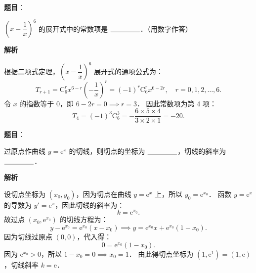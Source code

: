 \begin{answer}

\textbf{题目}：

$\left(x - \dfrac{1}{x}\right)^6$ 的展开式中的常数项是 $\underline{\hspace{1.5cm}}$．（用数字作答）

\textbf{解析}

根据二项式定理，$\left(x - \dfrac{1}{x}\right)^6$ 展开式的通项公式为：
\nopagebreak[4]
\[
T_{r+1} = \mathrm{C}_6^r x^{6-r} \left(-\frac{1}{x}\right)^r = (-1)^r \mathrm{C}_6^r x^{6-2r}, \quad r = 0, 1, 2, \dots, 6.
\]
令 $x$ 的指数等于 0，即 $6 - 2r = 0 \implies r = 3$．
因此常数项为第 4 项：
\nopagebreak[4]
\[
T_4 = (-1)^3 \mathrm{C}_6^3 = - \frac{6 \times 5 \times 4}{3 \times 2 \times 1} = -20.
\]


\end{answer}
\begin{answer}

\textbf{题目}：

过原点作曲线 $y = \mathrm{e}^x$ 的切线，则切点的坐标为 $\underline{\hspace{1.5cm}}$，切线的斜率为 $\underline{\hspace{1.5cm}}$．

\textbf{解析}

设切点坐标为 $(x_0, y_0)$，因为切点在曲线 $y = \mathrm{e}^x$ 上，所以 $y_0 = \mathrm{e}^{x_0}$．
函数 $y = \mathrm{e}^x$ 的导数为 $y' = \mathrm{e}^x$，因此切线的斜率为：
\nopagebreak[4]
\[
k = \mathrm{e}^{x_0}.
\]
故过点 $(x_0, \mathrm{e}^{x_0})$ 的切线方程为：
\nopagebreak[4]
\[
y - \mathrm{e}^{x_0} = \mathrm{e}^{x_0}(x - x_0) \implies y = \mathrm{e}^{x_0}x + \mathrm{e}^{x_0}(1 - x_0).
\]
因为切线过原点 $(0, 0)$，代入得：
\nopagebreak[4]
\[
0 = \mathrm{e}^{x_0}(1 - x_0).
\]
因为 $\mathrm{e}^{x_0} > 0$，所以 $1 - x_0 = 0 \implies x_0 = 1$．
由此得切点坐标为 $(1, \mathrm{e}^1) = (1, \mathrm{e})$，切线斜率 $k = \mathrm{e}$．


\end{answer}
